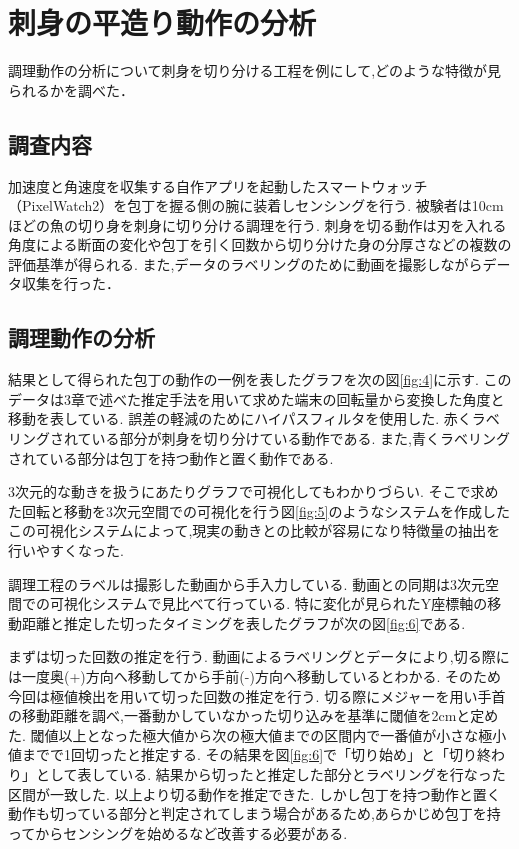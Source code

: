 \section{刺身の平造り動作の分析}
調理動作の分析について刺身を切り分ける工程を例にして,どのような特徴が見られるかを調べた．
\subsection{調査内容}
加速度と角速度を収集する自作アプリを起動したスマートウォッチ（PixelWatch2）を包丁を握る側の腕に装着しセンシングを行う.
被験者は10cmほどの魚の切り身を刺身に切り分ける調理を行う.
刺身を切る動作は刃を入れる角度による断面の変化や包丁を引く回数から切り分けた身の分厚さなどの複数の評価基準が得られる.
また,データのラベリングのために動画を撮影しながらデータ収集を行った．
\subsection{調理動作の分析}

結果として得られた包丁の動作の一例を表したグラフを次の図\ref{fig:4}に示す.
このデータは3章で述べた推定手法を用いて求めた端末の回転量から変換した角度と移動を表している.
誤差の軽減のためにハイパスフィルタを使用した.
赤くラベリングされている部分が刺身を切り分けている動作である.
また,青くラベリングされている部分は包丁を持つ動作と置く動作である.

3次元的な動きを扱うにあたりグラフで可視化してもわかりづらい.
そこで求めた回転と移動を3次元空間での可視化を行う図\ref{fig:5}のようなシステムを作成した
この可視化システムによって,現実の動きとの比較が容易になり特徴量の抽出を行いやすくなった.

調理工程のラベルは撮影した動画から手入力している.
動画との同期は3次元空間での可視化システムで見比べて行っている.
特に変化が見られたY座標軸の移動距離と推定した切ったタイミングを表したグラフが次の図\ref{fig:6}である.


まずは切った回数の推定を行う.
動画によるラベリングとデータにより,切る際には一度奥(+)方向へ移動してから手前(-)方向へ移動しているとわかる.
そのため今回は極値検出を用いて切った回数の推定を行う.
切る際にメジャーを用い手首の移動距離を調べ,一番動かしていなかった切り込みを基準に閾値を2cmと定めた.
閾値以上となった極大値から次の極大値までの区間内で一番値が小さな極小値までで1回切ったと推定する.
その結果を図\ref{fig:6}で「切り始め」と「切り終わり」として表している.
結果から切ったと推定した部分とラベリングを行なった区間が一致した.
以上より切る動作を推定できた.
しかし包丁を持つ動作と置く動作も切っている部分と判定されてしまう場合があるため,あらかじめ包丁を持ってからセンシングを始めるなど改善する必要がある.

